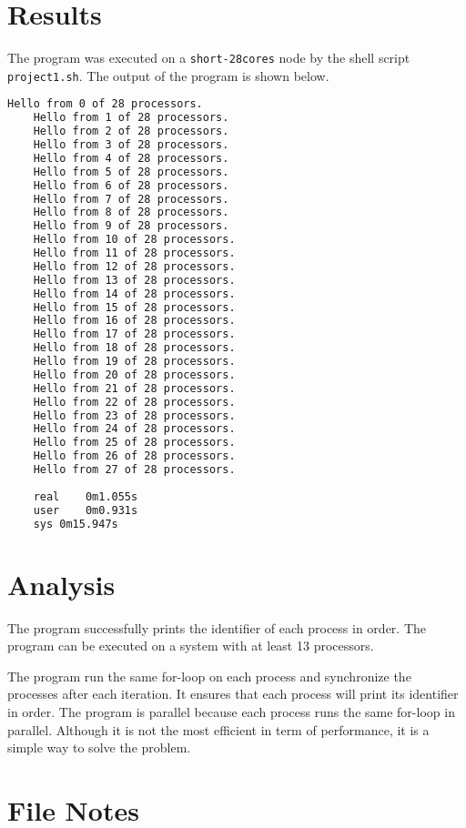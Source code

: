 \documentclass[12pt,a4paper]{article}
\begin{document}
\section{Results}
The program was executed on a \texttt{short-28cores} node by the shell script \texttt{project1.sh}. The output of the program is shown below.
\begin{lstlisting}[language=bash]
    Hello from 0 of 28 processors.
    Hello from 1 of 28 processors.
    Hello from 2 of 28 processors.
    Hello from 3 of 28 processors.
    Hello from 4 of 28 processors.
    Hello from 5 of 28 processors.
    Hello from 6 of 28 processors.
    Hello from 7 of 28 processors.
    Hello from 8 of 28 processors.
    Hello from 9 of 28 processors.
    Hello from 10 of 28 processors.
    Hello from 11 of 28 processors.
    Hello from 12 of 28 processors.
    Hello from 13 of 28 processors.
    Hello from 14 of 28 processors.
    Hello from 15 of 28 processors.
    Hello from 16 of 28 processors.
    Hello from 17 of 28 processors.
    Hello from 18 of 28 processors.
    Hello from 19 of 28 processors.
    Hello from 20 of 28 processors.
    Hello from 21 of 28 processors.
    Hello from 22 of 28 processors.
    Hello from 23 of 28 processors.
    Hello from 24 of 28 processors.
    Hello from 25 of 28 processors.
    Hello from 26 of 28 processors.
    Hello from 27 of 28 processors.
    
    real	0m1.055s
    user	0m0.931s
    sys	0m15.947s
\end{lstlisting}


\section{Analysis}
The program successfully prints the identifier of each process in order. 
The program can be executed on a system with at least 13 processors. 

The program run the same for-loop on each process and synchronize the processes after each iteration. 
It ensures that each process will print its identifier in order.
The program is parallel because each process runs the same for-loop in parallel.
Although it is not the most efficient in term of performance, it is a simple way to solve the problem.

\section*{File Notes}
\end{document}
